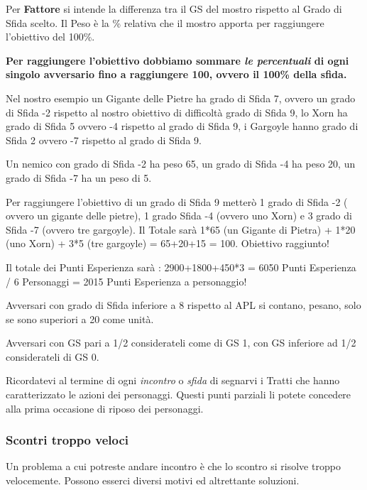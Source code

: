 \begin{multicols}{2}
\medskip

Per \textbf{Fattore} si intende la differenza tra il GS del mostro rispetto al Grado di Sfida scelto. Il Peso è la \% relativa che il mostro apporta per raggiungere l'obiettivo del 100\%.

\textbf{Per raggiungere l'obiettivo dobbiamo sommare \emph{le percentuali} di ogni singolo avversario fino a raggiungere 100, ovvero il 100\% della sfida.}

Nel nostro esempio un Gigante delle Pietre ha grado di Sfida 7, ovvero un grado di Sfida -2 rispetto al nostro obiettivo di difficoltà grado di Sfida 9, lo Xorn ha grado di Sfida 5 ovvero -4 rispetto al grado di Sfida 9, i Gargoyle hanno grado di Sfida 2 ovvero -7 rispetto al grado di Sfida 9.

Un nemico con grado di Sfida -2 ha peso 65, un grado di Sfida -4 ha peso 20, un grado di Sfida -7 ha un peso di 5.

Per raggiungere l'obiettivo di un grado di Sfida 9 metterò 1 grado di Sfida -2 ( ovvero un gigante delle pietre), 1 grado Sfida -4 (ovvero uno Xorn) e 3 grado di Sfida -7 (ovvero tre gargoyle). Il Totale sarà 1*65 (un Gigante di Pietra) + 1*20 (uno Xorn) + 3*5 (tre gargoyle) = 65+20+15 = 100. Obiettivo raggiunto!

Il totale dei Punti Esperienza sarà : 2900+1800+450*3 = 6050 Punti Esperienza / 6 Personaggi = 2015 Punti Esperienza a personaggio!

Avversari con grado di Sfida inferiore a 8 rispetto al APL si contano, pesano, solo se sono superiori a 20 come unità.

Avversari con GS pari a 1/2 considerateli come di GS 1, con GS inferiore ad 1/2 considerateli di GS 0.

\begin{narratore}
Ricordatevi al termine di ogni \emph{incontro} o \emph{sfida} di segnarvi i Tratti che hanno caratterizzato le azioni dei personaggi. Questi punti parziali li potete concedere alla prima occasione di riposo dei personaggi.
\end{narratore}

\subsubsection{Scontri troppo veloci}

Un problema a cui potreste andare incontro è che lo scontro si risolve troppo velocemente. Possono esserci diversi motivi ed altrettante soluzioni.


\end{multicols}
